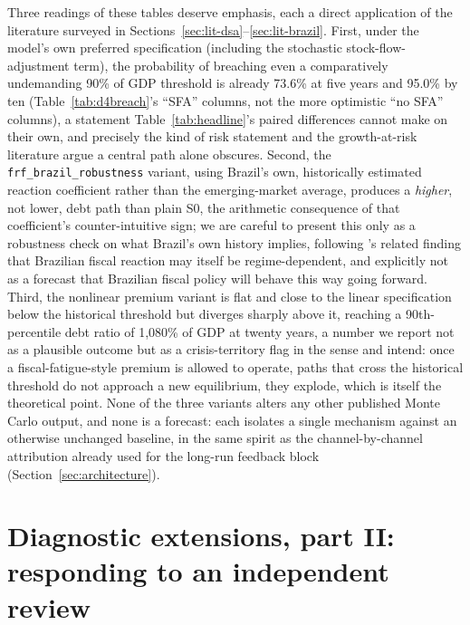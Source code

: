 \documentclass[11pt,a4paper]{article}
\begin{document}
Three readings of these tables deserve emphasis, each a direct application of the literature surveyed in Sections~\ref{sec:lit-dsa}--\ref{sec:lit-brazil}. First, under the model's own preferred specification (including the stochastic stock-flow-adjustment term), the probability of breaching even a comparatively undemanding 90\% of GDP threshold is already 73.6\% at five years and 95.0\% by ten (Table~\ref{tab:d4breach}'s ``SFA'' columns, not the more optimistic ``no SFA'' columns), a statement Table~\ref{tab:headline}'s paired differences cannot make on their own, and precisely the kind of risk statement \citet{garciarigobon2004} and the growth-at-risk literature \citep{prasadetal2019growthatrisk,lianpresbiterowiriadinata2020,furcerietal2025debtrisk} argue a central path alone obscures. Second, the \texttt{frf\_brazil\_robustness} variant, using Brazil's own, historically estimated reaction coefficient rather than the emerging-market average, produces a \emph{higher}, not lower, debt path than plain \textsc{S0}, the arithmetic consequence of that coefficient's counter-intuitive sign; we are careful to present this only as a robustness check on what Brazil's own history implies, following \citet{simonassilima2005}'s related finding that Brazilian fiscal reaction may itself be regime-dependent, and explicitly not as a forecast that Brazilian fiscal policy will behave this way going forward. Third, the nonlinear premium variant is flat and close to the linear specification below the historical threshold but diverges sharply above it, reaching a 90th-percentile debt ratio of 1,080\% of GDP at twenty years, a number we report not as a plausible outcome but as a crisis-territory flag in the sense \citet{ghoshkimmendozaostryqureshi2013} and \citet{bi2012} intend: once a fiscal-fatigue-style premium is allowed to operate, paths that cross the historical threshold do not approach a new equilibrium, they explode, which is itself the theoretical point. None of the three variants alters any other published Monte Carlo output, and none is a forecast: each isolates a single mechanism against an otherwise unchanged baseline, in the same spirit as the channel-by-channel attribution already used for the long-run feedback block (Section~\ref{sec:architecture}).

\section{Diagnostic extensions, part II: responding to an independent review}
\label{app:reviewer}
\end{document}

